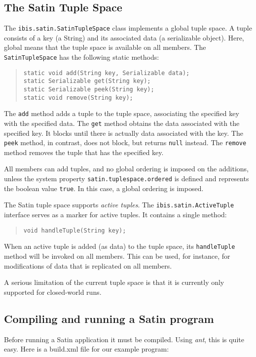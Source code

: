 \documentclass[10pt]{article}
\newcommand{\mysubsection}[1]{\subsection{#1}\label{#1}}
\begin{document}
\mysubsection{The Satin Tuple Space}

The \verb+ibis.satin.SatinTupleSpace+ class implements a global
tuple space.  A tuple consists of a key (a String) and its associated data
(a serializable object). Here, global means that the tuple space is
available on all members. The \verb+SatinTupleSpace+ has the following
static methods:

\begin{quote}
\begin{verbatim}
static void add(String key, Serializable data);
static Serializable get(String key);
static Serializable peek(String key);
static void remove(String key);
\end{verbatim}
\end{quote}

The \verb+add+ method adds a tuple to the tuple space, associating the
specified key with the specified data.
The \verb+get+ method obtains the data associated with the specified key.
It blocks until there is actually data associated with the key.
The \verb+peek+ method, in contrast, does not block, but returns
\verb+null+ instead.
The \verb+remove+ method removes the tuple that has the specified key.

All members can add tuples, and no global ordering is imposed on the
additions, unless the system property
\verb+satin.tuplespace.ordered+ is defined and represents the
boolean value \verb+true+. In this case, a global ordering is imposed.

The Satin tuple space supports \emph{active tuples}.
The \verb+ibis.satin.ActiveTuple+ interface serves
as a marker for active tuples. It contains a single method:

\begin{quote}
\begin{verbatim}
void handleTuple(String key);
\end{verbatim}
\end{quote}

When an active tuple is added (as data) to the tuple space,
its \verb+handleTuple+ method will be invoked on all members.
This can be used, for instance, for modifications of data that
is replicated on all members.

A serious limitation of the current tuple space is that it is
currently only supported for closed-world runs.

\mysubsection{Compiling and running a Satin program}

Before running a Satin application it must be compiled.
Using \emph{ant}, this is quite easy. Here is a build.xml file for
our example program:
\end{document}
